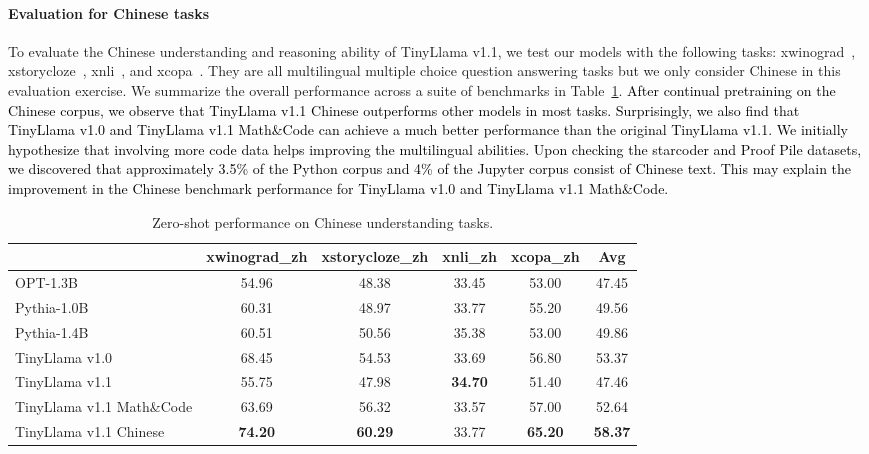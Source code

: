 \documentclass{article}
\begin{document}
\paragraph{Evaluation for Chinese tasks}
To evaluate the Chinese understanding and reasoning ability of TinyLlama v1.1, we test our models with the following {\color{black}tasks}: xwinograd~\citep{emelin-sennrich-2021-wino}, xstorycloze~\citep{lin-etal-2022-shot}, xnli~\citep{conneau-etal-2018-xnli}, {\color{black}and} xcopa~\citep{ponti-etal-2020-xcopa}.
They are all multilingual multiple choice question answering tasks but we only consider Chinese in this {\color{black}evaluation exercise}.
We summarize the overall performance across a suite of benchmarks in Table~\ref{tab:chinese}.
\textcolor{black}{After continual pretraining on the Chinese corpus, we observe that TinyLlama v1.1 Chinese outperforms other models in most tasks.
Surprisingly, we also find that TinyLlama v1.0 and TinyLlama v1.1 Math\&Code can achieve a much better performance than the original TinyLlama v1.1.
We initially hypothesize that involving more code data helps improving the multilingual abilities.
Upon checking the starcoder and Proof Pile datasets, we discovered that approximately 3.5\% of the Python corpus and 4\% of the Jupyter corpus consist of Chinese text.
This may explain the improvement in the Chinese benchmark performance for TinyLlama v1.0 and TinyLlama v1.1 Math\&Code.
}
\begin{table}[htbp]
  \centering
  \scriptsize
  \caption{
    Zero-shot performance on Chinese understanding tasks.
  }
  \begin{tabular}{lccccc}
    \toprule
    & \textbf{xwinograd\_zh}	& \textbf{xstorycloze\_zh} &	\textbf{xnli\_zh}	& \textbf{xcopa\_zh} & \textbf{Avg} \\
    \midrule
    OPT-1.3B\xspace      &  54.96 &  48.38 &  33.45 &  53.00 &  47.45 \\
    Pythia-1.0B\xspace      &  60.31 &  48.97 &  33.77 &  55.20 &  49.56\\
    Pythia-1.4B\xspace     &  60.51 &  50.56 &  35.38 &  53.00 &  49.86 \\
    \midrule
    TinyLlama v1.0\xspace   &  68.45 &  54.53 &  33.69 &  56.80 &  53.37  \\
    TinyLlama v1.1\xspace   &  55.75 &  47.98 &  \textbf{34.70} &  51.40 &  47.46  \\
    TinyLlama v1.1 Math\&Code\xspace    &  63.69 &  56.32 &  33.57 &  57.00 &  52.64  \\
    TinyLlama v1.1 Chinese\xspace     &  \textbf{74.20} &  \textbf{60.29} &  33.77 &  \textbf{65.20}&  \textbf{58.37} \\
    \bottomrule
  \end{tabular}
  \label{tab:chinese}
\end{table}
\end{document}
